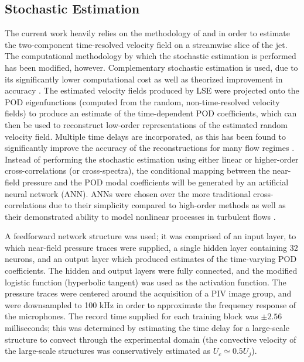 \subsection{Stochastic Estimation}
The current work heavily relies on the methodology of \citet{Tinney2008b} and \citet{Sinha2010} in order to estimate the two-component time-resolved velocity field on a streamwise slice of the jet.
The computational methodology by which the stochastic estimation is performed has been modified, however.
Complementary stochastic estimation is used, due to its significantly lower computational cost as well as theorized improvement in accuracy \citep{Bonnet1994}.
The estimated velocity fields produced by LSE were projected onto the POD eigenfunctions (computed from the random, non-time-resolved velocity fields) to produce an estimate of the time-dependent POD coefficients, which can then be used to reconstruct low-order representations of the estimated random velocity field.
Multiple time delays are incorporated, as this has been found to significantly improve the accuracy of the reconstructions for many flow regimes \citep{Ewing1997,Tinney2006,Tinney2008b,Durgesh2010}.
Instead of performing the stochastic estimation using either linear or higher-order cross-correlations (or cross-spectra), the conditional mapping between the near-field pressure and the POD modal coefficients will be generated by an artificial neural network (ANN).
ANNs were chosen over the more traditional cross-correlations due to their simplicity compared to high-order methods as well as their demonstrated ability to model nonlinear processes in turbulent flows \citep{Lasagna2015}.

A feedforward network structure was used; it was comprised of an input layer, to which near-field pressure traces were supplied, a single hidden layer containing 32 neurons, and an output layer which produced estimates of the time-varying POD coefficients. 
The hidden and output layers were fully connected, and the modified logistic function (hyperbolic tangent) was used as the activation function.
The pressure traces were centered around the acquisition of a PIV image group, and were downsampled to 100 kHz in order to approximate the frequency response of the microphones.
The record time supplied for each training block was $\pm 2.56$ milliseconds; this was determined by estimating the time delay for a large-scale structure to convect through the experimental domain (the convective velocity of the large-scale structures was conservatively estimated as $U_c \simeq 0.5 U_j$).

